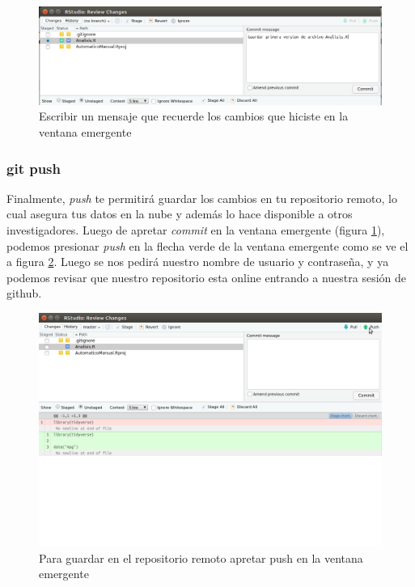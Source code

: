 \documentclass[]{book}
\begin{document}
\begin{figure}

{\centering \includegraphics[width=0.8\linewidth]{MensajeCommit} 

}

\caption{Escribir un mensaje que recuerde los cambios que hiciste en la ventana emergente}\label{fig:MensajeCommit}
\end{figure}

\hypertarget{git-push}{%
\subsubsection{git push}\label{git-push}}

Finalmente, \emph{push} te permitirá guardar los cambios en tu
repositorio remoto, lo cual asegura tus datos en la nube y además lo
hace disponible a otros investigadores. Luego de apretar \emph{commit}
en la ventana emergente (figura \ref{fig:MensajeCommit}), podemos
presionar \emph{push} en la flecha verde de la ventana emergente como se
ve el a figura \ref{fig:push}. Luego se nos pedirá nuestro nombre de
usuario y contraseña, y ya podemos revisar que nuestro repositorio esta
online entrando a nuestra sesión de github.

\begin{figure}

{\centering \includegraphics[width=0.8\linewidth]{Push} 

}

\caption{Para guardar en el repositorio remoto apretar push en la ventana emergente}\label{fig:push}
\end{figure}
\end{document}
